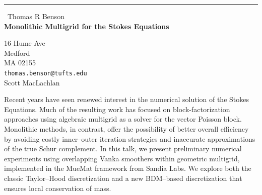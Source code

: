 \documentclass{report}
\begin{document}
\begin{center}
\rule{6in}{1pt} \
{\large Thomas R Benson \\
{\bf Monolithic Multigrid for the Stokes Equations}}

16 Hume Ave \\ Medford \\ MA 02155
\\
{\tt thomas.benson@tufts.edu}\\
Scott MacLachlan\end{center}

Recent years have seen renewed interest in the numerical solution of the
Stokes Equations. Much of the resulting work has focused on
block-factorization approaches using algebraic multigrid as a solver for
the vector Poisson block. Monolithic methods, in contrast, offer the
possibility of better overall efficiency by avoiding costly inner--outer
iteration strategies and inaccurate approximations of the true Schur
complement. In this talk, we present preliminary numerical experiments
using overlapping Vanka smoothers within geometric multigrid, implemented
in the MueMat framework from Sandia Labs. We explore both the classic
Taylor--Hood discretization and a new BDM--based discretization that
ensures local conservation of mass.
\end{document}
